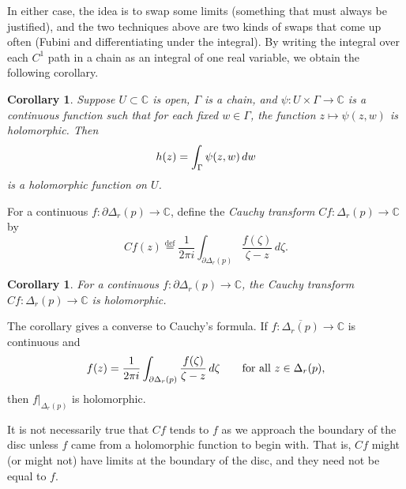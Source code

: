 \documentclass[12pt,openany]{book}
\newcommand{\glsadd}[2][]{}
\newcommand{\avoidbreak}{\postdisplaypenalty=100}
\newcommand{\C}{{\mathbb{C}}}
\newcommand{\myindex}[1]{#1\index{#1}}
\theoremstyle{plain}
\newtheorem{cor}[thm]{Corollary}
\theoremstyle{remark}
\theoremstyle{definition}
\theoremstyle{exercise}
\theoremstyle{example}
\begin{document}
In either case, the idea is to swap some limits (something that must always
be justified),
and the two techniques above are two kinds of swaps that come up
often (Fubini and differentiating under the integral).  By writing the
integral over each
$C^1$ path in a chain as an integral of one real variable, we obtain the following
corollary.

\begin{cor} \label{cor:holfuncbyintegral}
Suppose $U \subset \C$ is open, $\Gamma$ is a 
chain,
and
$\psi \colon U \times \Gamma \to \C$ is a continuous function such that
for each fixed $w \in \Gamma$, the function $z \mapsto \psi(z,w)$ is
holomorphic.  Then
\begin{equation*}
h(z) =
\int_\Gamma \psi(z,w) \, dw
\avoidbreak
\end{equation*}
is a holomorphic function on $U$.
\end{cor}

For a continuous $f \colon \partial \Delta_r(p) \to \C$, define
the \emph{\myindex{Cauchy transform}} $Cf \colon \Delta_r(p) \to \C$ by
\glsadd{not:Cauchytransform}%
\begin{equation*}
Cf(z)
\overset{\text{def}}{=}
\frac{1}{2\pi i}
\int_{\partial \Delta_r(p)}
\frac{f(\zeta)}{\zeta-z}\, d\zeta .
\end{equation*}

\begin{cor}
For a continuous $f \colon \partial \Delta_r(p) \to \C$,
the Cauchy transform $Cf \colon \Delta_r(p) \to \C$ is holomorphic.
\end{cor}

The corollary gives a converse to Cauchy's formula.
If $f \colon \overline{\Delta_r(p)} \to \C$ is continuous and
\begin{equation*}
f(z) =
\frac{1}{2\pi i}
\int_{\partial \Delta_r(p)} \frac{f(\zeta)}{\zeta-z} \, d\zeta
\qquad \text{for all } z \in \Delta_r(p),
\avoidbreak
\end{equation*}
then $f|_{\Delta_r(p)}$ is holomorphic.

It is not necessarily true that $Cf$ tends to $f$ as we approach the
boundary of the disc unless $f$ came from 
a holomorphic function to begin with.  That is, $Cf$ might (or might not) have limits at
the boundary of the disc, and they need not be equal to $f$.
\end{document}
